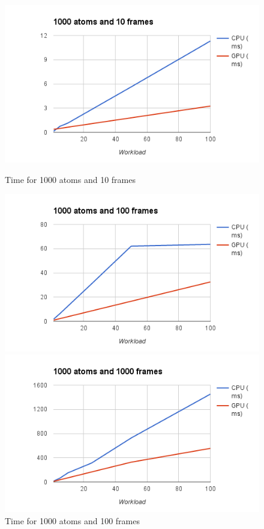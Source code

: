 \documentclass[12pt,letterpaper]{report}
\begin{document}
\begin{figure}[!tbp]
  \centering
  \begin{minipage}[b]{0.4\textwidth}
    \includegraphics[width=\textwidth]{images/exp_1000_10}
    \caption{Time for 1000 atoms and 10 frames}
    \label{fg:exp_1000_10}
  \end{minipage}
  \hfill
  \begin{minipage}[b]{0.4\textwidth}
    \includegraphics[width=\textwidth]{images/exp_1000_100}
    \caption{Time for 1000 atoms and 100 frames}
     \label{fg:exp_1000_100}
  \end{minipage}
\hfill
  \begin{minipage}[b]{0.4\textwidth}
    \includegraphics[width=\textwidth]{images/exp_1000_1000}

\end{minipage}
\end{figure}
\end{document}
